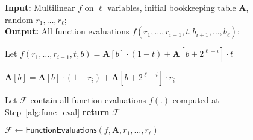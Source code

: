 \begin{figure}
\begin{algorithm}[H]
		\caption{$\mathcal{F}\leftarrow \textsf{FunctionEvaluations}(f,\textbf{A},r_1,\ldots,r_\ell)$}\label{alg:evaluate}
		 \textbf{Input:} Multilinear $f$ on $\ell$ variables, initial bookkeeping table $\textbf{A}$, random $r_1,\ldots,r_\ell$;  \\
    \textbf{Output:} All function evaluations $f(r_1,\ldots, r_{i-1}, t, b_{i+1},\ldots, b_{\ell})$; 
   
		\begin{algorithmic}[1]
		 
				  \label{step:consider_b}
					 \State \label{alg:func_eval} Let $f(r_1,\ldots, r_{i-1}, t, b) = \textbf{A}[b]\cdot (1-t)+\textbf{A}[b+2^{\ell-i}]\cdot t$
					\EndFor
					
					
					
					\State\label{alg::dynamic::update} $\textbf{A}[b]=\textbf{A}[b]\cdot(1-r_i)+\textbf{A}[b+2^{\ell-i}]\cdot r_i$
				\EndFor
								
		
		\EndFor	
		\State Let $\mathcal{F}$ contain all function evaluations $f(.)$ computed at Step~\ref{alg:func_eval}
		\State \textbf{return} $\mathcal{F}$
		\end{algorithmic}
	\end{algorithm}
	
\end{figure}

